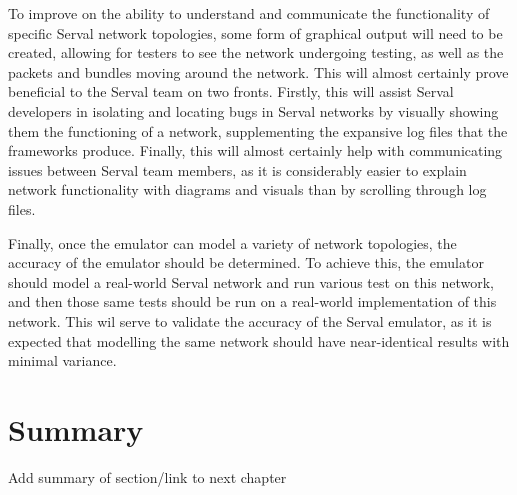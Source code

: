 To improve on the ability to understand and communicate the functionality of specific Serval network topologies, some form of graphical output will need to be created, allowing for testers to see the network undergoing testing, as well as the packets and bundles moving around the network.
This will almost certainly prove beneficial to the Serval team on two fronts. 
Firstly, this will assist Serval developers in isolating and locating bugs in Serval networks by visually showing them the functioning of a network, supplementing the expansive log files that the frameworks produce.
Finally, this will almost certainly help with communicating issues between Serval team members, as it is considerably easier to explain network functionality with diagrams and visuals than by scrolling through log files.

Finally, once the emulator can model a variety of network topologies, the accuracy of the emulator should be determined.
To achieve this, the emulator should model a real-world Serval network and run various test on this network, and then those same tests should be run on a real-world implementation of this network.
This wil serve to validate the accuracy of the Serval emulator, as it is expected that modelling the same network should have near-identical results with minimal variance.

\section{Summary}
Add summary of section/link to next chapter